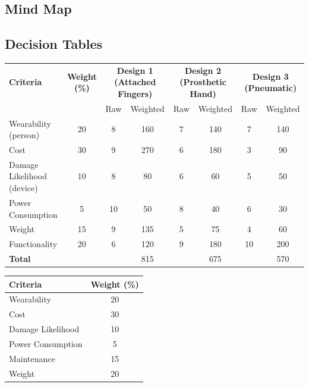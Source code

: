 \documentclass{article}
\begin{document}
\subsection{Mind Map}


\subsection{Decision Tables}

\begin{table}[h]
    \noindent\hspace{-4.5cm}
    \small
    \begin{tabular}{l c | c c | c c | c c}
        \toprule
        \textbf{Criteria} & \textbf{Weight (\%)} & \multicolumn{2}{c|}{\textbf{Design 1 (Attached Fingers)}} & \multicolumn{2}{c|}{\textbf{Design 2 (Prosthetic Hand)}} & \multicolumn{2}{c}{\textbf{Design 3 (Pneumatic)}} \\
        \cmidrule(lr){3-4} \cmidrule(lr){5-6} \cmidrule(lr){7-8}
        & & Raw & Weighted & Raw & Weighted & Raw & Weighted \\
        \midrule
        Wearability (person) & 20 & 8 & 160 & 7 & 140 & 7 & 140 \\
        Cost & 30 & 9 & 270 & 6 & 180 & 3 & 90 \\
        Damage Likelihood (device) & 10 & 8 & 80 & 6 & 60 & 5 & 50 \\
        Power Consumption & 5 & 10 & 50 & 8 & 40 & 6 & 30 \\
        Weight & 15 & 9 & 135 & 5 & 75 & 4 & 60 \\
        Functionality & 20 & 6 & 120 & 9 & 180 & 10 & 200 \\
        \midrule
        \textbf{Total} & & & 815 & & 675 & & 570 \\
        \bottomrule
    \end{tabular}
\end{table}

\begin{table}[h]
    \centering
    \begin{tabular}{l c}
        \toprule
        \textbf{Criteria} & \textbf{Weight (\%)} \\
        \midrule
        Wearability & 20 \\
        Cost & 30 \\
        Damage Likelihood & 10 \\
        Power Consumption & 5 \\
        Maintenance & 15 \\
        Weight & 20 \\
        \bottomrule
    \end{tabular}
\end{table}
\end{document}
